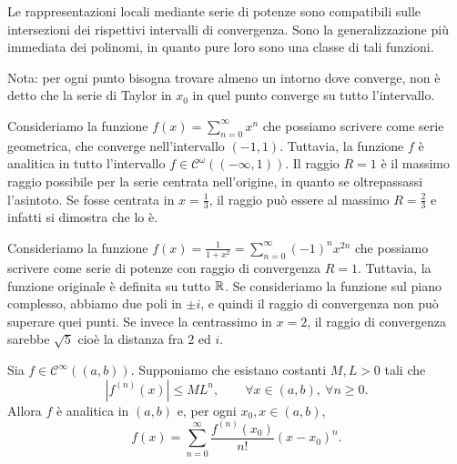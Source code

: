 \documentclass[a4paper]{article}
\begin{document}
\begin{radioactive}
Le rappresentazioni locali mediante serie di potenze sono compatibili sulle intersezioni dei rispettivi intervalli di convergenza.
Sono la generalizzazione più immediata dei polinomi, in quanto
pure loro sono una classe di tali funzioni.
\end{radioactive}

\begin{radioactive}
Nota: per ogni punto bisogna trovare almeno un intorno dove converge, non è detto
che la serie di Taylor in \(x_0\) in quel punto converge su tutto l'intervallo.
\end{radioactive}

\begin{radioactive}
\begin{snippetexample}{}
    Consideriamo la funzione \(f(x) = \sum_{n=0}^\infty x^n\)
    che possiamo scrivere come serie geometrica, che converge nell'intervallo \((-1, 1)\).
    Tuttavia, la funzione \(f\) è analitica in tutto l'intervallo
    \(f\in \mathcal C^\omega((-\infty, 1))\).
    Il raggio \(R=1\) è il massimo raggio possibile per la serie centrata nell'origine,
    in quanto se oltrepassassi l'asintoto.
    Se fosse centrata in \(x=\frac13\), il raggio può essere al massimo \(R=\frac23\)
    e infatti si dimostra che lo è.
\end{snippetexample}
\end{radioactive}

\begin{radioactive}
\begin{snippetexample}{}
    Consideriamo la funzione \(f(x) = \frac{1}{1 + x^2} = \sum_{n=0}^\infty(-1)^n x^{2n}\)
    che possiamo scrivere come serie di potenze con raggio di convergenza \(R=1\).
    Tuttavia, la funzione originale è definita su tutto \(\mathbb{R}\).
    Se consideriamo la funzione sul piano complesso, abbiamo due poli in \(\pm i\),
    e quindi il raggio di convergenza non può superare quei punti.
    Se invece la centrassimo in \(x=2\), il raggio di convergenza sarebbe \(\sqrt{5}\)
    cioè la distanza fra \(2\) ed \(i\).
\end{snippetexample}
\end{radioactive}

\begin{radioactive}
\begin{snippettheorem}{}
    Sia \(f\in\mathcal C^\infty((a,b))\). Supponiamo che esistano costanti
    \(M,L>0\) tali che
    \[
        |f^{(n)}(x)|\leq ML^n,
        \qquad \forall x\in(a,b),\ \forall n\geq0.
    \]
    Allora \(f\) è analitica in \((a,b)\) e, per ogni \(x_0,x\in(a,b)\),
    \[
        f(x)=\sum_{n=0}^\infty\frac{f^{(n)}(x_0)}{n!}(x-x_0)^n.
    \]
\end{snippettheorem}
\end{radioactive}
\end{document}
